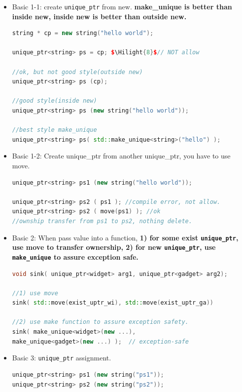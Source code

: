 \documentclass[a4paper,11pt,twoside]{book}
\newcommand{\Hilight}[1]{\makebox[0pt][l]{\color{yellow}\rule[-3pt]{#1em}{11pt}}}
\newcommand{\Hilight}[1]{}
\begin{document}
\begin{itemize}

\item Basic 1-1: create \texttt{unique\_ptr} from new.    \textbf{make\_unique is better than inside new, inside new is better than outside new.}
\begin{lstlisting}[frame=single, language=c++]
string * cp = new string("hello world");

unique_ptr<string> ps = cp; $\Hilight{8}$// NOT allow

//ok, but not good style(outside new)
unique_ptr<string> ps (cp);

//good style(inside new)
unique_ptr<string> ps (new string("hello world"));

//best style make_unique
unique_ptr<string> ps( std::make_unique<string>("hello") );
\end{lstlisting}

\item Basic 1-2: Create unique\_ptr from another unique\_ptr, you have to use move.
\begin{lstlisting}[frame=single, language=c++]
unique_ptr<string> ps1 (new string("hello world"));

unique_ptr<string> ps2 ( ps1 ); //compile error, not allow.
unique_ptr<string> ps2 ( move(ps1) ); //ok
//ownship transfer from ps1 to ps2, nothing delete.
\end{lstlisting}

\item Basic 2: When pass value into a function, \textbf{1) for some exist \texttt{unique\_ptr}, use move to transfer ownership, 2) for new \texttt{unique\_ptr}, use \texttt{make\_unique} to assure exception safe.}

\begin{lstlisting}[frame=single, language=c++]
void sink( unique_ptr<widget> arg1, unique_ptr<gadget> arg2);

//1) use move
sink( std::move(exist_uptr_wi), std::move(exist_uptr_ga))

//2) use make function to assure exception safety.
sink( make_unique<widget>(new ...),
make_unique<gadget>(new ...) );  // exception-safe
\end{lstlisting}


\item Basic 3: \texttt{unique\_ptr} assignment.
\begin{lstlisting}[frame=single, language=c++]
unique_ptr<string> ps1 (new string("ps1"));
unique_ptr<string> ps2 (new string("ps2"));


\end{lstlisting}
\end{itemize}
\end{document}
